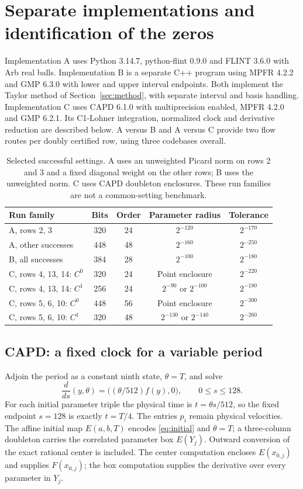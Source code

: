 \documentclass[10pt,a4paper]{article}
\theoremstyle{remark}
\begin{document}
\section{Separate implementations and identification of the zeros}
\label{sec:implementations}
Implementation A uses Python 3.14.7, python-flint 0.9.0 and FLINT 3.6.0
with Arb real balls. Implementation B is a separate C++ program using
MPFR 4.2.2 and GMP 6.3.0 with lower and upper interval endpoints. Both
implement the Taylor method of Section~\ref{sec:method}, with separate
interval and basis handling. Implementation C uses CAPD 6.1.0 with
multiprecision enabled, MPFR 4.2.0 and GMP 6.2.1. Its C1-Lohner
integration, normalized clock and derivative reduction are described
below. A versus B and A versus C provide two flow routes per doubly
certified row, using three codebases overall.

\begin{table}[htbp]
\centering\small
\begin{tabular}{@{}lcccc@{}}
\toprule
Run family & Bits & Order & Parameter radius & Tolerance\\
\midrule
A, rows 2, 3 & 320 & 24 & $2^{-120}$ & $2^{-170}$\\
A, other successes & 448 & 48 & $2^{-160}$ & $2^{-250}$\\
B, all successes & 384 & 28 & $2^{-100}$ & $2^{-180}$\\
C, rows 4, 13, 14: $C^0$ & 320 & 24 & Point enclosure & $2^{-220}$\\
C, rows 4, 13, 14: $C^1$ & 256 & 24 & $2^{-90}$ or $2^{-100}$ & $2^{-180}$\\
C, rows 5, 6, 10: $C^0$ & 448 & 56 & Point enclosure & $2^{-300}$\\
C, rows 5, 6, 10: $C^1$ & 320 & 48 & $2^{-130}$ or $2^{-140}$ & $2^{-260}$\\
\bottomrule
\end{tabular}
\caption{Selected successful settings. A uses an unweighted Picard
norm on rows 2 and 3 and a fixed diagonal weight on the other rows;
B uses the unweighted norm. C uses CAPD doubleton enclosures. These
run families are not a common-setting benchmark.}
\label{tab:settings}
\end{table}

\subsection{CAPD: a fixed clock for a variable period}
Adjoin the period as a constant ninth state, $\theta=T$, and solve
\begin{equation}
 \frac{d}{ds}(y,\theta)=\bigl((\theta/512)f(y),0\bigr),
 \qquad 0\le s\le128.
 \label{eq:clock}
\end{equation}
For each initial parameter triple the physical time is
$t=\theta s/512$, so the fixed endpoint $s=128$ is exactly $t=T/4$.
The entries $p_i$ remain physical velocities. The affine initial map
$E(a,b,T)$ encodes \eqref{eq:initial} and $\theta=T$; a three-column
doubleton carries the correlated parameter box $E(Y_j)$. Outward
conversion of the exact rational center is included. The center
computation encloses $E(x_{0,j})$ and supplies $F(x_{0,j})$; the box
computation supplies the derivative over every parameter in $Y_j$.
\end{document}
